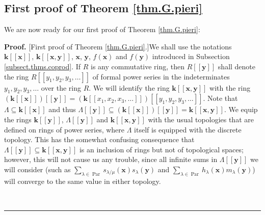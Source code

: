 \documentclass[numbers=enddot,12pt,final,onecolumn,notitlepage]{scrartcl}%
\theoremstyle{definition}
\newenvironment{proof}[1][Proof]{\noindent\textbf{#1.} }{\ \rule{0.5em}{0.5em}}
\let\sumnonlimits\sum
\renewcommand{\sum}{\sumnonlimits\limits}
\begin{document}
\subsection{\label{subsect.proofs.G.pieri.1st}First proof of Theorem
\ref{thm.G.pieri}}

We are now ready for our first proof of Theorem \ref{thm.G.pieri}:

\begin{proof}
[First proof of Theorem \ref{thm.G.pieri}.]We shall use the notations
$\mathbf{k}\left[  \left[  \mathbf{x}\right]  \right]  $, $\mathbf{k}\left[
\left[  \mathbf{x},\mathbf{y}\right]  \right]  $, $\mathbf{x}$, $\mathbf{y}$,
$f\left(  \mathbf{x}\right)  $ and $f\left(  \mathbf{y}\right)  $ introduced
in Subsection \ref{subsect.thms.coprod}. If $R$ is any commutative ring, then
$R\left[  \left[  \mathbf{y}\right]  \right]  $ shall denote the ring
$R\left[  \left[  y_{1},y_{2},y_{3},\ldots\right]  \right]  $ of formal power
series in the indeterminates $y_{1},y_{2},y_{3},\ldots$ over the ring $R$. We
will identify the ring $\mathbf{k}\left[  \left[  \mathbf{x},\mathbf{y}%
\right]  \right]  $ with the ring $\left(  \mathbf{k}\left[  \left[
\mathbf{x}\right]  \right]  \right)  \left[  \left[  \mathbf{y}\right]
\right]  =\left(  \mathbf{k}\left[  \left[  x_{1},x_{2},x_{3},\ldots\right]
\right]  \right)  \left[  \left[  y_{1},y_{2},y_{3},\ldots\right]  \right]  $.
Note that $\Lambda\subseteq\mathbf{k}\left[  \left[  \mathbf{x}\right]
\right]  $ and thus $\Lambda\left[  \left[  \mathbf{y}\right]  \right]
\subseteq\left(  \mathbf{k}\left[  \left[  \mathbf{x}\right]  \right]
\right)  \left[  \left[  \mathbf{y}\right]  \right]  =\mathbf{k}\left[
\left[  \mathbf{x},\mathbf{y}\right]  \right]  $. We equip the rings
$\mathbf{k}\left[  \left[  \mathbf{y}\right]  \right]  $, $\Lambda\left[
\left[  \mathbf{y}\right]  \right]  $ and $\mathbf{k}\left[  \left[
\mathbf{x},\mathbf{y}\right]  \right]  $ with the usual topologies that are
defined on rings of power series, where $\Lambda$ itself is equipped with the
discrete topology. This has the somewhat confusing consequence that
$\Lambda\left[  \left[  \mathbf{y}\right]  \right]  \subseteq\mathbf{k}\left[
\left[  \mathbf{x},\mathbf{y}\right]  \right]  $ is an inclusion of rings but
not of topological spaces; however, this will not cause us any trouble, since
all infinite sums in $\Lambda\left[  \left[  \mathbf{y}\right]  \right]  $ we
will consider (such as $\sum_{\lambda\in\operatorname*{Par}}s_{\lambda/\mu
}\left(  \mathbf{x}\right)  s_{\lambda}\left(  \mathbf{y}\right)  $ and
$\sum_{\lambda\in\operatorname*{Par}}h_{\lambda}\left(  \mathbf{x}\right)
m_{\lambda}\left(  \mathbf{y}\right)  $) will converge to the same value in
either topology.


\end{proof}
\end{document}
